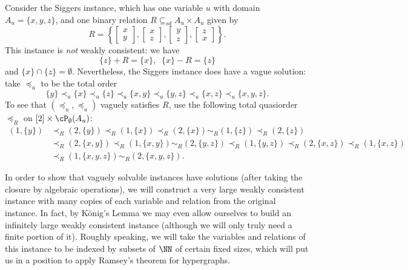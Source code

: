 \begin{ex} Consider the Siggers instance, which has one variable $u$ with domain $A_u = \{x,y,z\}$, and one binary relation $R \subseteq_{sd} A_u \times A_u$ given by
\[
R = \left\{\begin{bmatrix}x\\y\end{bmatrix},\begin{bmatrix}x\\z\end{bmatrix},\begin{bmatrix}y\\z\end{bmatrix},\begin{bmatrix}z\\x\end{bmatrix}\right\}.
\]
This instance is \emph{not} weakly consistent: we have
\[
\{z\} + R = \{x\}, \;\; \{x\} - R = \{z\}
\]
and $\{x\} \cap \{z\} = \emptyset$. Nevertheless, the Siggers instance does have a vague solution: take $\preceq_u$ to be the total order
\[
\{y\} \prec_u \{x\} \prec_u \{z\} \prec_u \{x,y\} \prec_u \{y,z\} \prec_u \{x,z\} \prec_u \{x,y,z\}.
\]
To see that $(\preceq_u,\preceq_u)$ vaguely satisfies $R$, use the following total quasiorder $\preceq_R$ on $[2] \times \cP_\emptyset(A_u)$:
\begin{align*}
(1,\{y\}) &\prec_R (2,\{y\}) \prec_R (1,\{x\}) \prec_R (2,\{x\}) \sim_R (1,\{z\}) \prec_R (2,\{z\})\\
&\prec_R (2,\{x,y\}) \prec_R (1,\{x,y\}) \sim_R (2,\{y,z\}) \prec_R (1,\{y,z\}) \prec_R (2,\{x,z\}) \prec_R (1,\{x,z\})\\
&\prec_R (1,\{x,y,z\}) \sim_R (2,\{x,y,z\}).
\end{align*}
\end{ex}

In order to show that vaguely solvable instances have solutions (after taking the closure by algebraic operations), we will construct a very large weakly consistent instance with many copies of each variable and relation from the original instance. In fact, by K\"onig's Lemma we may even allow ourselves to build an infinitely large weakly consistent instance (although we will only truly need a finite portion of it). Roughly speaking, we will take the variables and relations of this instance to be indexed by subsets of $\NN$ of certain fixed sizes, which will put us in a position to apply Ramsey's theorem for hypergraphs.

